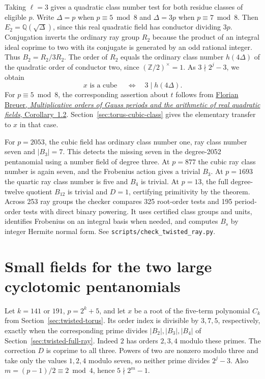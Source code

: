 \documentclass[11pt]{article}
\begin{document}
Taking \(\ell=3\) gives a quadratic class number test for both
residue classes of eligible \(p\). Write \(\Delta=p\) when
\(p\equiv5\bmod8\) and \(\Delta=3p\) when \(p\equiv7\bmod8\).
Then \(E_2=\mathbb Q(\sqrt{\Delta})\), since this real quadratic
field has conductor dividing \(3p\). Conjugation inverts the
ordinary ray group \(R_2\) because the product of an integral ideal
coprime to two with its conjugate is generated by an odd rational
integer. Thus \(B_2=R_2/3R_2\). The order of \(R_2\) equals the
ordinary class number \(h(4\Delta)\) of the quadratic order
of conductor two, since \((\mathbb Z/2)^\times=1\).
As \(3\nmid2^j-3\), we obtain
\[
          x\text{ is a cube }\quad\Longleftrightarrow\quad
                    3\mid h(4\Delta).
\]
For \(p\equiv5\bmod8\), the corresponding assertion about \(t\)
follows from \href{https://arxiv.org/abs/2006.10344}
{Florian Breuer, \emph{Multiplicative orders of Gauss periods and
the arithmetic of real quadratic fields}, Corollary~1.2}.
Section~\ref{sec:torus-cubic-class} gives the elementary transfer
to \(x\) in that case.

For \(p=2053\), the cubic field has ordinary class number one,
ray class number seven and \(|B_3|=7\). This detects the missing
seven in the degree-2052 pentanomial using a number field of
degree three. At \(p=877\) the cubic ray class number is again
seven, and the Frobenius action gives a trivial \(B_3\).
At \(p=1693\) the quartic ray class number is five and \(B_4\)
is trivial. At \(p=13\), the full degree-twelve quotient \(B_{12}\)
is trivial and \(D=1\), certifying primitivity by the theorem.
Across 253 ray groups the checker compares 325 root-order tests
and 195 period-order tests with direct binary powering. It uses certified class groups and
units, identifies Frobenius on an integral basis when needed,
and computes \(B_s\) by integer Hermite normal form. See
\nolinkurl{scripts/check_twisted_ray.py}.

\clearpage
\section{Small fields for the two large cyclotomic pentanomials}
\label{sec:large-twisted-fields}

Let \(k=141\) or \(191\), \(p=2^k+5\), and let \(x\) be a root of
the five-term polynomial \(C_k\) from Section~\ref{sec:twisted-torus}.
Its order index is divisible by \(3,7,5\), respectively, exactly
when the corresponding prime divides \(|B_2|,|B_3|,|B_4|\) of
Section~\ref{sec:twisted-full-ray}. Indeed \(2\) has orders \(2,3,4\)
modulo these primes. The correction \(D\) is coprime to all three.
Powers of two are nonzero modulo three and take only the values
\(1,2,4\) modulo seven, so neither prime divides \(2^j-3\).
Also \(m=(p-1)/2\equiv2\bmod4\), hence \(5\nmid 2^m-1\).
\end{document}
